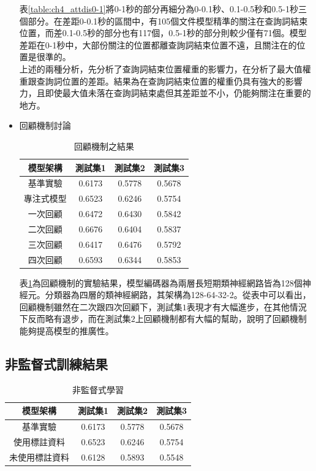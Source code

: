 \begin{itemize}
表\ref{table:ch4_attdis0-1}將0-1秒的部分再細分為0-0.1秒、0.1-0.5秒和0.5-1秒三個部分。在差距0-0.1秒的區間中，有105個文件模型精準的關注在查詢詞結束位置，而差0.1-0.5秒的部分也有117個，0.5-1秒的部分則較少僅有71個。模型差距在0-1秒中，大部份關注的位置都離查詢詞結束位置不遠，且關注在的位置是很準的。
\\

上述的兩種分析，先分析了查詢詞結束位置權重的影響力，在分析了最大值權重跟查詢詞位置的差距。結果為在查詢詞結束位置的權重仍具有強大的影響力，且即使最大值未落在查詢詞結束處但其差距並不小，仍能夠關注在重要的地方。

\item{回顧機制討論}

\begin{table}[hb]
	 \centering
	 \caption{回顧機制之結果}
	 \label{table:ch4_hop}
	 \begin{tabular}{|c|c|c|c|c|}
		 \hline
		 \multicolumn{2}{|c|}{模型架構} & 測試集1 & 測試集2 & 測試集3 \\
		 \hline
		 \multicolumn{2}{|c|}{基準實驗} & 0.6173 & 0.5778 & 0.5678\\
		 \hline
		 \multicolumn{2}{|c|}{專注式模型} &0.6523 &0.6246 & 0.5754 \\
		 \hline
		 \multicolumn{2}{|c|}{一次回顧} &0.6472 &0.6430 & 0.5842 \\
		 \hline
		 \multicolumn{2}{|c|}{二次回顧} &{\color{red}0.6676}&0.6404 & 0.5837 \\
		 \hline
		 \multicolumn{2}{|c|}{三次回顧} &0.6417&0.6476 & 0.5792 \\
		 \hline
		 \multicolumn{2}{|c|}{四次回顧} &0.6593& 0.6344 &0.5853\\
		 \hline
	   \end{tabular}
\end{table}
表\ref{table:ch4_hop}為回顧機制的實驗結果，模型編碼器為兩層長短期類神經網路皆為128個神經元。分類器為四層的類神經網路，其架構為128-64-32-2。從表中可以看出，回顧機制雖然在二次跟四次回顧下，測試集$1$表現才有大幅進步，在其他情況下反而略有退步，而在測試集$2$上回顧機制都有大幅的幫助，說明了回顧機制能夠提高模型的推廣性。


\end{itemize}
\subsection{非監督式訓練結果}
\begin{table}[ht]
	 \centering
	 \caption{非監督式學習}
	 \label{table:ch4_unsup}
	 \begin{tabular}{|c|c|c|c|c|}
		 \hline
		 \multicolumn{2}{|c|}{模型架構} & 測試集1 & 測試集2 & 測試集3 \\
		 \hline
		 \multicolumn{2}{|c|}{基準實驗} & 0.6173 & 0.5778 & 0.5678\\
		 \hline
		 \multicolumn{2}{|c|}{使用標註資料} &0.6523&0.6246 &0.5754 \\
		 \hline
		 \multicolumn{2}{|c|}{未使用標註資料} &0.6128&0.5893 &0.5548 \\
		 \hline
	   \end{tabular}
\end{table}

